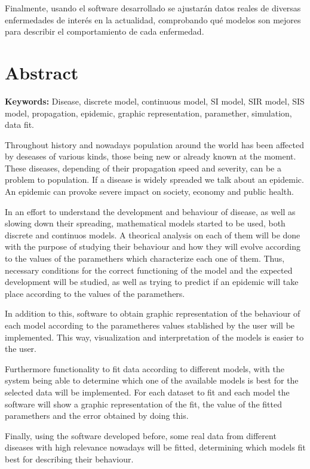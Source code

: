 Finalmente, usando el software desarrollado se ajustarán datos reales de diversas enfermedades de interés en la actualidad, comprobando qué modelos son mejores para describir el comportamiento de cada enfermedad.



\chapter*{Abstract}

\textbf{Keywords: } Disease, discrete model, continuous model, SI model, SIR model, SIS model, propagation, epidemic, graphic representation, paramether, simulation, data fit.

Throughout history and nowadays population around the world has been affected by deseases of various kinds, those being new or already known at the moment. These diseases, depending of their propagation speed and severity, can be a problem to population. If a disease is widely spreaded we talk about an epidemic. An epidemic can provoke severe impact on society, economy and public health.

In an effort to understand the development and behaviour of disease, as well as slowing down their spreading, mathematical models started to be used, both discrete and continuos models. A theorical analysis on each of them will be done with the purpose of studying their behaviour and how they will evolve according to the values of the paramethers which characterize each one of them. Thus, necessary conditions for the correct functioning of the model and the expected development will be studied, as well as trying to predict if an epidemic will take place according to the values of the paramethers.

In addition to this, software  to obtain graphic representation of the behaviour of each model according to the parametheres values stablished by the user will be implemented. This way, visualization and interpretation of the models is easier to the user.

Furthermore functionality to fit data according to different models, with the system being able to determine which one of the available models is best for the selected data will be implemented. For each dataset to fit and each model the software will show a graphic representation of the fit, the value of the fitted paramethers and the error obtained by doing this.

Finally, using the software developed before, some real data from different diseases with high relevance nowadays will be fitted, determining which models fit best for describing their behaviour.

